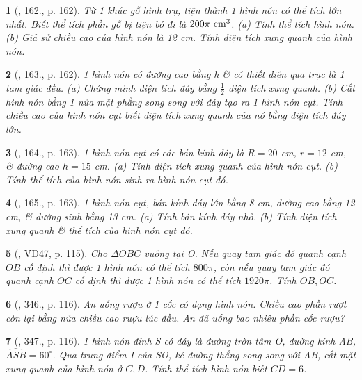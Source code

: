 \documentclass{article}
\newtheorem{baitoan}{}
\begin{document}
\begin{baitoan}[\cite{Tuyen_Toan_9_old}, 162., p. 162]
	Từ 1 khúc gỗ hình trụ, tiện thành 1 hình nón có thể tích lớn nhất. Biết thể tích phần gỗ bị tiện bỏ đi là $200\pi\ {\rm cm}^3$. (a) Tính thể tích hình nón. (b) Giả sử chiều cao của hình nón là {\rm12 cm}. Tính diện tích xung quanh của hình nón.
\end{baitoan}

\begin{baitoan}[\cite{Tuyen_Toan_9_old}, 163., p. 162]
	1 hình nón có đường cao bằng h \& có thiết diện qua trục là 1 tam giác đều. (a) Chứng minh diện tích đáy bằng $\frac{1}{2}$ diện tích xung quanh. (b) Cắt hình nón bằng 1 nửa mặt phẳng song song với đáy tạo ra 1 hình nón cụt. Tính chiều cao của hình nón cụt biết diện tích xung quanh của nó bằng diện tích đáy lớn.
\end{baitoan}

\begin{baitoan}[\cite{Tuyen_Toan_9_old}, 164., p. 163]
	1 hình nón cụt có các bán kính đáy là $R = 20$ {\rm cm}, $r = 12$ {\rm cm}, \& đường cao $h = 15$ {\rm cm}. (a) Tính diện tích xung quanh của hình nón cụt. (b) Tính thể tích của hình nón sinh ra hình nón cụt đó.
\end{baitoan}

\begin{baitoan}[\cite{Tuyen_Toan_9_old}, 165., p. 163]
	1 hình nón cụt, bán kính đáy lớn bằng {\rm8 cm}, đường cao bằng {\rm12 cm}, \& đường sinh bằng {\rm13 cm}. (a) Tính bán kính đáy nhỏ. (b) Tính diện tích xung quanh \& thể tích của hình nón cụt đó.
\end{baitoan}

\begin{baitoan}[\cite{Binh_Toan_9_tap_2}, VD47, p. 115]
	Cho $\Delta OBC$ vuông tại O. Nếu quay tam giác đó quanh cạnh $OB$ cố định thì được 1 hình nón có thể tích $800\pi$, còn nếu quay tam giác đó quanh cạnh $OC$ cố định thì được 1 hình nón có thể tích $1920\pi$. Tính $OB,OC$.
\end{baitoan}

\begin{baitoan}[\cite{Binh_Toan_9_tap_2}, 346., p. 116]
	An uống rượu ở 1 cốc có dạng hình nón. Chiều cao phần rượt còn lại bằng nửa chiều cao rượu lúc đầu. An đã uống bao nhiêu phần cốc rượu?
\end{baitoan}

\begin{baitoan}[\cite{Binh_Toan_9_tap_2}, 347., p. 116]
	1 hình nón đỉnh S có đáy là đường tròn tâm O, đường kính AB, $\widehat{ASB} = 60^\circ$. Qua trung điểm I của SO, kẻ đường thẳng song song với AB, cắt mặt xung quanh của hình nón ở $C,D$. Tính thể tích hình nón biết $CD = 6$.
\end{baitoan}
\end{document}
